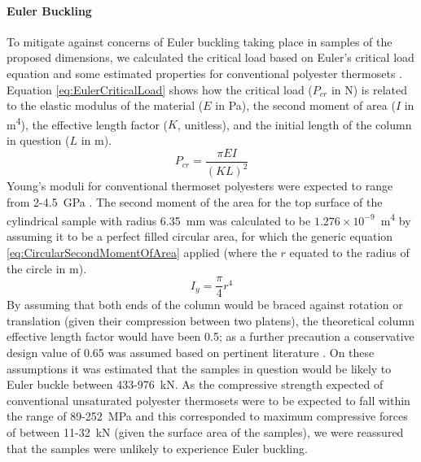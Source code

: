\paragraph{Euler Buckling}
To mitigate against concerns of Euler buckling taking place in samples of
 the proposed dimensions, we calculated the critical load based on
 Euler's critical load equation and some estimated properties for
 conventional polyester thermosets \cite{Euler1744}.
Equation \ref{eq:EulerCriticalLoad} shows how the critical load 
 (\(P_{cr}\) in \unit{\newton}) is related to the elastic modulus of the
 material (\(E\) in \unit{\pascal}), the second moment of area (\(I\) in
 \unit{\metre^{4}}),
 the effective length factor (\(K\), unitless), and the initial length of
 the column in question (\(L\) in \unit{\metre}).
\begin{equation}\label{eq:EulerCriticalLoad}
    P_{cr}=\frac{\pi EI}{(KL)^2}
\end{equation}
Young's moduli for conventional thermoset polyesters were expected to range
 from 2-4.5~\unit{\giga\pascal} \cite{Lawrence1960}.
The second moment of the area for the top surface of the cylindrical sample
 with radius 6.35~\unit{\milli\metre} was calculated to be
 \(1.276\times10^{-9}\)~\unit{\metre^{4}} by assuming it to be a perfect
 filled circular area, for which the generic equation
 \ref{eq:CircularSecondMomentOfArea} applied (where the \(r\) equated to the
 radius of the circle in \unit{\metre}).
\begin{equation}\label{eq:CircularSecondMomentOfArea}
    I_{y}=\frac{\pi}{4}r^{4}
\end{equation}
By assuming that both ends of the column would be braced against rotation
 or translation (given their compression between two platens), the
 theoretical column effective length factor would have been 0.5; as a
 further precaution a conservative design value of 0.65 was assumed
 based on pertinent literature \cite{AISC1989}.
On these assumptions it was estimated that the samples in question would
 be likely to Euler buckle between 433-976~\unit{\kilo\newton}.
As the compressive strength expected of conventional unsaturated
 polyester thermosets were to be expected to fall within the range of
 89-252~\unit{\mega\pascal} and this corresponded to maximum compressive
 forces of between 11-32~\unit{\kilo\newton} (given the surface area of
 the samples), we were reassured that the samples were unlikely to
 experience Euler buckling.

